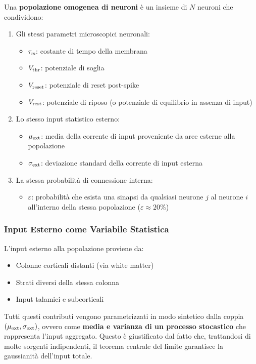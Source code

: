 Una \textbf{popolazione omogenea di neuroni} è un insieme di $N$ neuroni che condividono:

\begin{enumerate}
    \item Gli stessi parametri microscopici neuronali:
    \begin{itemize}
        \item $\tau_m$: costante di tempo della membrana
        \item $V_{\rm thr}$: potenziale di soglia
        \item $V_{\rm reset}$: potenziale di reset post-spike
        \item $V_{\rm rest}$: potenziale di riposo (o potenziale di equilibrio in assenza di input)
    \end{itemize}
    \item Lo stesso input statistico esterno:
    \begin{itemize}
        \item $\mu_{\rm ext}$: media della corrente di input proveniente da aree esterne alla popolazione
        \item $\sigma_{\rm ext}$: deviazione standard della corrente di input esterna
    \end{itemize}
    \item La stessa probabilità di connessione interna:
    \begin{itemize}
        \item $\varepsilon$: probabilità che esista una sinapsi da qualsiasi neurone $j$ al neurone $i$ all'interno della stessa popolazione ($\varepsilon \approx 20\%$)
    \end{itemize}
\end{enumerate}

\subsubsection{Input Esterno come Variabile Statistica}

L'input esterno alla popolazione proviene da:
\begin{itemize}
    \item Colonne corticali distanti (via white matter)
    \item Strati diversi della stessa colonna
    \item Input talamici e subcorticali
\end{itemize}

Tutti questi contributi vengono parametrizzati in modo sintetico dalla coppia $(\mu_{\rm ext}, \sigma_{\rm ext})$, ovvero come \textbf{media e varianza di un processo stocastico} che rappresenta l'input aggregato. Questo è giustificato dal fatto che, trattandosi di molte sorgenti indipendenti, il teorema centrale del limite garantisce la gaussianità dell'input totale.

